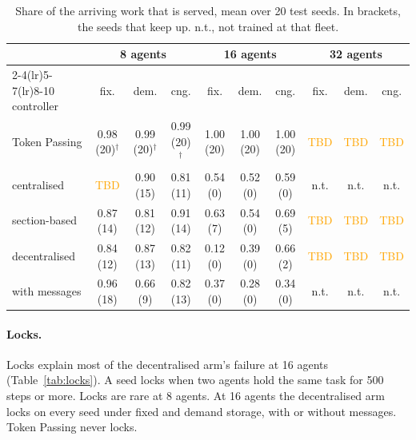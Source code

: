 \documentclass[11pt,a4paper]{article}
\newcommand{\tbd}{\textcolor{orange}{TBD}}
\begin{document}
\begin{table}[H]
  \centering
  \caption{Share of the arriving work that is served, mean over 20 test seeds. In brackets, the seeds
    that keep up. n.t., not trained at that fleet.}
  \label{tab:served}
  \footnotesize\setlength{\tabcolsep}{3pt}
  \begin{tabular}{l ccc ccc ccc}
    \toprule
    & \multicolumn{3}{c}{8 agents} & \multicolumn{3}{c}{16 agents} & \multicolumn{3}{c}{32 agents} \\
    \cmidrule(lr){2-4}\cmidrule(lr){5-7}\cmidrule(lr){8-10}
    controller & fix. & dem. & cng. & fix. & dem. & cng. & fix. & dem. & cng. \\
    \midrule
    Token Passing  & 0.98 (20)$^\dagger$ & 0.99 (20)$^\dagger$ & 0.99 (20)$^\dagger$ & 1.00 (20) & 1.00 (20) & 1.00 (20) & \tbd & \tbd & \tbd \\
    centralised    & \tbd      & 0.90 (15) & 0.81 (11) & 0.54 (0) & 0.52 (0) & 0.59 (0) & n.t. & n.t. & n.t. \\
    section-based  & 0.87 (14) & 0.81 (12) & 0.91 (14) & 0.63 (7) & 0.54 (0) & 0.69 (5) & \tbd & \tbd & \tbd \\
    decentralised  & 0.84 (12) & 0.87 (13) & 0.82 (11) & 0.12 (0) & 0.39 (0) & 0.66 (2) & \tbd & \tbd & \tbd \\
    with messages  & 0.96 (18) & 0.66 (9)  & 0.82 (13) & 0.37 (0) & 0.28 (0) & 0.34 (0) & n.t. & n.t. & n.t. \\
    \bottomrule
  \end{tabular}
\end{table}

\paragraph{Locks.}
Locks explain most of the decentralised arm's failure at 16 agents (Table~\ref{tab:locks}). A seed
locks when two agents hold the same task for 500 steps or more. Locks are rare at 8 agents. At 16
agents the decentralised arm locks on every seed under fixed and demand storage, with or without
messages. Token Passing never locks.
\end{document}
